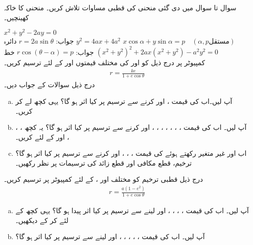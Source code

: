 سوال  تا سوال  میں دی گئی منحنی کی قطبی مساوات تلاش کریں۔ منحنی کا خاکہ کھینچیں۔

$x^2+y^2-2ay=0$\\
جواب:\quad
$r=2a\sin\theta$\quad
دائرہ
$y^2=4ax+4a^2$
$x\cos\alpha+y\sin\alpha=p\quad (\alpha, p \text{مستقل})$\\
جواب:\quad
$r\cos(\theta-\alpha)=p$\quad
خط
$(x^2+y^2)^2+2ax(x^2+y^2)-a^2y^2=0$
\\
کمپیوٹر پر درج ذیل کو  اور  کی مختلف قیمتوں اور  کے لئے ترسیم کریں۔
\begin{align*}
r=\frac{ke}{1+e\cos\theta}
\end{align*}
درج ذیل سوالات کے جواب دیں۔
\begin{enumerate}[a.]
\item
آپ  لیں۔اب  کی قیمت ،  اور  کرنے سے ترسیم پر کیا اثر ہو گا؟ یہی کچھ  لے کر کریں۔ 
\item
آپ  لیں۔ اب  کی قیمت ، ، ، ، ، ، ،  اور  کرنے سے ترسیم پر کیا اثر ہو گا؟ یہ کچھ ، ، ،  اور  کے لئے کریں۔
\item
اب  اور غیر متغیر رکھتے ہوئے  کی قیمت ، ، ،  اور  کرنے سے ترسیم پر کیا اثر ہو گا؟ ترخیم، قطع مکافی اور قطع زائد کی ترسیمات پر نظر رکھیں۔
\end{enumerate}
درج ذیل قطبی ترخیم کو مختلف اور ،  کے لئے  کمپیوٹر پر ترسیم کریں۔
\begin{align*}
r=\frac{a(1-e^2)}{1+e\cos\theta}
\end{align*}
\begin{enumerate}[a.]
\item
آپ  لیں۔ اب  کی قیمت ، ، ، ،  اور  لینے سے ترسیم پر کیا اثر پیدا ہو گا؟ یہی کچھ  کے لئے کر کے دیکھیں۔
\item
آپ لیں۔ اب  کی قیمت ، ، ، ، ،  اور  لینے سے ترسیم  پر کیا اثر ہو گا؟
\end{enumerate}
